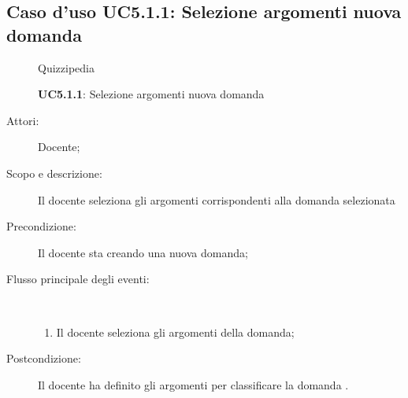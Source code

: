 \subsection{Caso d'uso UC5.1.1: Selezione argomenti nuova domanda}
	\begin{figure}[H]
		\centering
		\begin{resizedtikzpicture}{\textwidth}
		\begin{umlsystem}[x=0, fill=lightgray!20]{Quizzipedia}
		\end{umlsystem}
		\end{resizedtikzpicture}
		\caption{\textbf{UC5.1.1}: Selezione argomenti nuova domanda}
		\label{UC5.1.1}
	\end{figure}
\begin{description}
\item[Attori:] Docente;
\item[Scopo e descrizione:] Il docente seleziona gli argomenti corrispondenti alla domanda selezionata
      \item[Precondizione:] Il docente sta creando una nuova domanda;

        \item[Flusso principale degli eventi:] \ 
 \begin{enumerate}
          \item Il docente seleziona gli argomenti della domanda;

      \end{enumerate}
    \item[Postcondizione:] Il docente ha definito gli argomenti per classificare la domanda
.
  \end{description}
\hypertarget{UC5.1.2}{}
